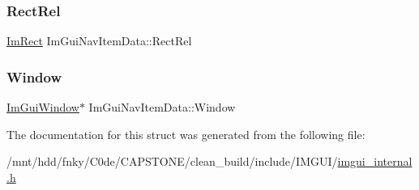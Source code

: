 \mbox{\label{structImGuiNavItemData_a62029a2962e6eb2969306437bcada51d}} 
\subsubsection{\texorpdfstring{Rect\+Rel}{RectRel}}
{\footnotesize\ttfamily \hyperlink{structImRect}{Im\+Rect} Im\+Gui\+Nav\+Item\+Data\+::\+Rect\+Rel}

\mbox{\label{structImGuiNavItemData_ac2aefd3b2555404e8f5fd08f1fac7478}} 
\subsubsection{\texorpdfstring{Window}{Window}}
{\footnotesize\ttfamily \hyperlink{structImGuiWindow}{Im\+Gui\+Window}$\ast$ Im\+Gui\+Nav\+Item\+Data\+::\+Window}



The documentation for this struct was generated from the following file\+:\begin{DoxyCompactItemize}
\item 
/mnt/hdd/fnky/\+C0de/\+C\+A\+P\+S\+T\+O\+N\+E/clean\+\_\+build/include/\+I\+M\+G\+U\+I/\hyperlink{imgui__internal_8h}{imgui\+\_\+internal.\+h}\end{DoxyCompactItemize}
